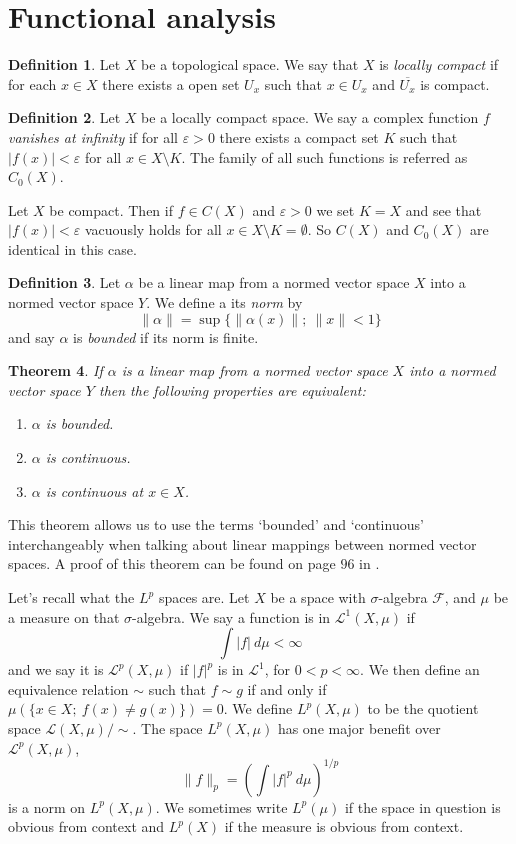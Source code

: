 \documentclass[a4paper,12pt,twoside,BCOR=10mm]{scrbook}
\newtheorem{theorem}{Theorem}[section]
\theoremstyle{definition}
\theoremstyle{definition}
\theoremstyle{definition}
\newtheorem{definition}[theorem]{Definition}
\begin{document}
\section{Functional analysis}
\begin{definition}
Let $X$ be a topological space.
We say that $X$ is \emph{locally compact} if for each $x \in X$ there exists a open set $U_x$ such that $x \in U_x$ and $\overline{U_x}$ is compact.
\end{definition}
\begin{definition}
\label{locallycompactdef}
Let $X$ be a locally compact space.
We say a complex function $f$ \emph{vanishes at infinity} if for all $\varepsilon > 0$ there exists a compact set $K$ such that $|f(x)| < \varepsilon$ for all $x \in X \setminus K$.
The family of all such functions is referred as $C_0(X)$.
\end{definition}
Let $X$ be compact.
Then if $f \in C(X)$ and $\varepsilon > 0$ we set $K = X$ and see that $|f(x)| < \varepsilon$ vacuously holds for all $x \in X \setminus K = \emptyset$.
So $C(X)$ and $C_0(X)$ are identical in this case.
\begin{definition}
Let $\alpha$ be a linear map from a normed vector space $X$ into a normed vector space $Y$.
We define a its \emph{norm} by
\[
	\|\alpha\| = \sup\{\|\alpha(x)\|;\ \|x\| < 1\}
\]
and say $\alpha$ is \emph{bounded} if its norm is finite.
\end{definition}
\begin{theorem}
If $\alpha$ is a linear map from a normed vector space $X$ into a normed vector space $Y$ then the following properties are equivalent:
\begin{enumerate}
\item[\emph{(i)}] $\alpha$ is bounded.
\item[\emph{(ii)}] $\alpha$ is continuous.
\item[\emph{(iii)}] $\alpha$ is continuous at $x \in X$.
\end{enumerate}
\end{theorem}
This theorem allows us to use the terms `bounded' and `continuous' interchangeably when talking about linear mappings between normed vector spaces.
A proof of this theorem can be found on page $96$ in \citep{rudin2}.

Let's recall what the $L^p$ spaces are.
Let $X$ be a space with $\sigma$-algebra $\mathcal{F}$, and $\mu$ be a measure on that $\sigma$-algebra.
We say a function is in $\mathcal{L}^1(X, \mu)$ if
\[
	\int |f|\ d\mu < \infty
\]
and we say it is $\mathcal{L}^p(X, \mu)$ if $|f|^p$ is in $\mathcal{L}^1$, for $0 < p < \infty$.
We then define an equivalence relation $\sim$ such that $f \sim g$ if and only if $\mu(\{x \in X;\ f(x) \neq g(x)\}) = 0$.
We define $L^p(X, \mu)$ to be the quotient space $\mathcal{L}(X, \mu)/\sim$.
The space $L^p(X, \mu)$ has one major benefit over $\mathcal{L}^p(X, \mu)$,
\[
	\|f\|_p = 
	\left ( \int |f|^p\ d\mu \right )^{1/p}
\]
is a norm on $L^p(X, \mu)$.
We sometimes write $L^p(\mu)$ if the space in question is obvious from context and $L^p(X)$ if the measure is obvious from context.
\end{document}
